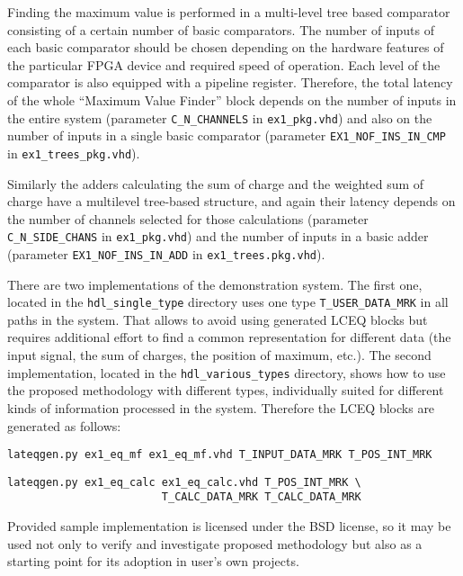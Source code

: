 \documentclass[preprint,11pt]{elsarticle}
\begin{document}
Finding the maximum value is performed in a multi-level tree based comparator consisting of a certain number 	of basic comparators. 
The number of inputs of each basic comparator should be chosen depending on the hardware features of the particular FPGA device and required speed of operation.
Each level of the comparator is also equipped with a pipeline register. 
Therefore, the total latency of the whole ``Maximum Value Finder'' block depends
on the number of inputs in the entire system (parameter \verb|C_N_CHANNELS| in
\verb|ex1_pkg.vhd|) and also on the number of inputs in a single basic comparator
(parameter \verb|EX1_NOF_INS_IN_CMP| in \verb|ex1_trees_pkg.vhd|).

Similarly the adders calculating the sum of charge and the weighted sum of charge have a multilevel tree-based structure, and again their latency depends on the number of channels selected for those calculations (parameter \verb|C_N_SIDE_CHANS| in \verb|ex1_pkg.vhd|) and the number of inputs in a basic adder 
(parameter \verb|EX1_NOF_INS_IN_ADD| in \verb|ex1_trees.pkg.vhd|).

There are two implementations of the demonstration system. The first one, located in
the \verb|hdl_single_type| directory uses one type \verb|T_USER_DATA_MRK| in all paths
in the system. That allows to avoid using generated LCEQ blocks but requires
additional effort to find a common representation for different data (the input signal,
the sum of charges, the position of maximum, etc.).
The second implementation, located in the \verb|hdl_various_types| directory,
shows how to use the proposed methodology with different types, individually 
suited for different kinds of information processed in the system. Therefore
the LCEQ blocks are generated as follows:

\verb|lateqgen.py ex1_eq_mf ex1_eq_mf.vhd T_INPUT_DATA_MRK T_POS_INT_MRK|

\verb|lateqgen.py ex1_eq_calc ex1_eq_calc.vhd T_POS_INT_MRK \|\\
\verb|                        T_CALC_DATA_MRK T_CALC_DATA_MRK|

Provided sample implementation is licensed under the BSD license, so it may be used
not only to verify and investigate proposed methodology but also as a starting point for its adoption in user's own projects.
\end{document}
